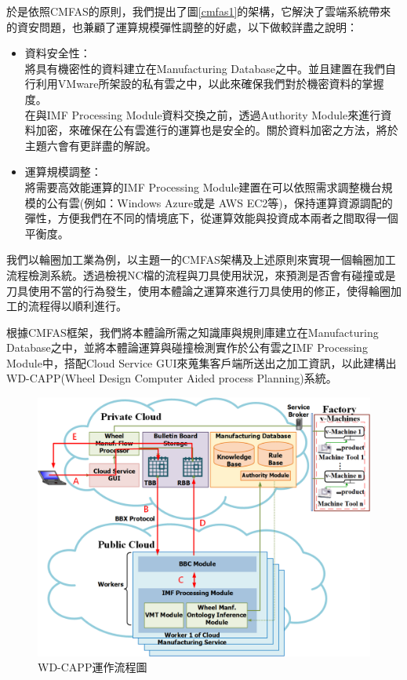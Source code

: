 \documentclass[CJK,12pt,t]{article}
\begin{document}
\begin{CJK*}{UTF8}{bkai}
		於是依照CMFAS的原則，我們提出了圖\ref{cmfas1}的架構，它解決了雲端系統帶來的資安問題，也兼顧了運算規模彈性調整的好處，以下做較詳盡之說明：
		\begin{itemize}
		\setlength{\itemsep}{5pt}
			\item 資料安全性：\\
					將具有機密性的資料建立在Manufacturing Database之中。並且建置在我們自行利用VMware所架設的私有雲之中，以此來確保我們對於機密資料的掌握度。\\
					在與IMF Processing Module資料交換之前，透過Authority Module來進行資料加密，來確保在公有雲進行的運算也是安全的。關於資料加密之方法，將於主題六會有更詳盡的解說。

			\item 運算規模調整：\\
				將需要高效能運算的IMF Processing Module建置在可以依照需求調整機台規模的公有雲(例如：Windows Azure或是 AWS EC2等)，保持運算資源調配的彈性，方便我們在不同的情境底下，從運算效能與投資成本兩者之間取得一個平衡度。
		\end{itemize}

		我們以輪圈加工業為例，以主題一的CMFAS架構及上述原則來實現一個輪圈加工流程檢測系統。透過檢視NC檔的流程與刀具使用狀況，來預測是否會有碰撞或是刀具使用不當的行為發生，使用本體論之運算來進行刀具使用的修正，使得輪圈加工的流程得以順利進行。

		根據CMFAS框架，我們將本體論所需之知識庫與規則庫建立在Manufacturing Database之中，並將本體論運算與碰撞檢測實作於公有雲之IMF Processing Module中，搭配Cloud Service GUI來蒐集客戶端所送出之加工資訊，以此建構出WD-CAPP(Wheel Design Computer Aided process Planning)系統。

		\vspace{20pt}
		\begin{figure}[ht]
			\begin{center}
				\includegraphics[scale=0.299]{figs/step-wdcaspp.png}
				\caption{WD-CAPP運作流程圖}
				\label{cmfas2}
			\end{center}
		\end{figure}


\end{CJK*}
\end{document}

